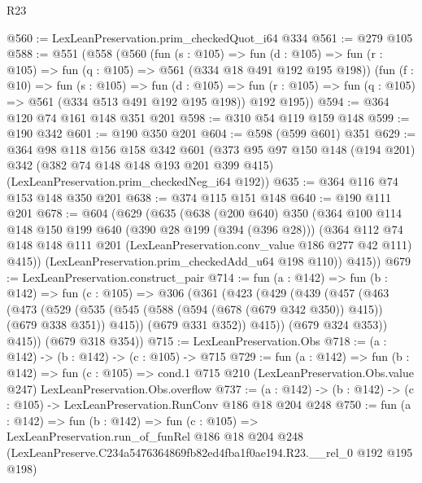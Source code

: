 \begin{lexlean}{R23}
\begin{coremodule}
@560 := LexLeanPreservation.prim_checkedQuot_i64 @334
@561 := @279 @105
@588 := @551
    (@558
      (@560
        (fun (s : @105) =>
        fun (d : @105) => fun (r : @105) => fun (q : @105) => @561 (@334 @18 @491 @192 @195 @198))
        (fun (f : @10) =>
        fun (s : @105) =>
        fun (d : @105) => fun (r : @105) => fun (q : @105) => @561 (@334 @513 @491 @192 @195 @198))
        @192
        @195))
@594 := @364 @120 @74 @161 @148 @351 @201
@598 := @310 @54 @119 @159 @148
@599 := @190 @342
@601 := @190 @350 @201
@604 := @598 (@599 @601) @351
@629 := @364
    @98
    @118
    @156
    @158
    @342
    @601
    (@373
      @95
      @97
      @150
      @148
      (@194 @201)
      @342
      (@382 @74 @148 @148 @193 @201 @399 @415)
      (LexLeanPreservation.prim_checkedNeg_i64 @192))
@635 := @364 @116 @74 @153 @148 @350 @201
@638 := @374 @115 @151 @148
@640 := @190 @111 @201
@678 := @604
    (@629
      (@635
        (@638
          (@200 @640)
          @350
          (@364
            @100
            @114
            @148
            @150
            @199
            @640
            (@390 @28 @199 (@394 (@396 @28)))
            (@364
              @112
              @74
              @148
              @148
              @111
              @201
              (LexLeanPreservation.conv_value @186 @277 @42 @111)
              @415))
          (LexLeanPreservation.prim_checkedAdd_u64 @198 @110))
        @415))
@679 := LexLeanPreservation.construct_pair
@714 := fun (a : @142) =>
  fun (b : @142) =>
  fun (c : @105) =>
  @306
    (@361
      (@423
        (@429
          (@439
            (@457
              (@463
                (@473
                  (@529
                    (@535 (@545 (@588 (@594 (@678 (@679 @342 @350)) @415)) (@679 @338 @351)) @415))
                  (@679 @331 @352))
                @415))
            (@679 @324 @353))
          @415))
      (@679 @318 @354))
@715 := LexLeanPreservation.Obs
@718 := (a : @142) -> (b : @142) -> (c : @105) -> @715
@729 := fun (a : @142) =>
  fun (b : @142) =>
  fun (c : @105) =>
  cond.{1} @715 @210 (LexLeanPreservation.Obs.value @247) LexLeanPreservation.Obs.overflow
@737 := (a : @142) -> (b : @142) -> (c : @105) -> LexLeanPreservation.RunConv @186 @18 @204 @248
@750 := fun (a : @142) =>
  fun (b : @142) =>
  fun (c : @105) =>
  LexLeanPreservation.run_of_funRel
    @186
    @18
    @204
    @248
    (LexLeanPreserve.C234a5476364869fb82ed4fba1f0ae194.R23.__rel_0 @192 @195 @198)
\end{coremodule}
\end{lexlean}
